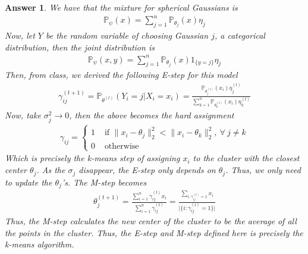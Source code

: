 \documentclass[12pt]{article}
\theoremstyle{colon}
\newtheorem*{answer}{Answer}
\begin{document}
\begin{answer}
  We have that the mixture for spherical Gaussians is
  \begin{gather*}
    \mathbb{P}_{\psi} (x) = \sum_{j=1}^n \mathbb{P}_{\theta_j} (x) \eta_j
  \end{gather*}
  Now, let $Y$ be the random variable of choosing Gaussian $j$, a categorical distribution, then the joint distribution is
  \begin{gather*}
    \mathbb{P}_{\psi} (x, y) = \sum_{j=1}^n \mathbb{P}_{\theta_j} (x) 1_{\{y = j\}} \eta_j
  \end{gather*}
  Then, from class, we derived the following E-step for this model
  \begin{gather*}
    \gamma_{ij}^{(t+1)} = \mathbb{P}_{\theta^{(t)}} (Y_i = j | X_i = x_i) = \frac{\mathbb{P}_{\theta_j^{(t)}}(x_i) \eta_j^{(t)}}{\sum_{k=1}^n \mathbb{P}_{\theta_k^{(t)}}(x_i) \eta_k^{(t)}}
  \end{gather*}
  Now, take $\sigma_j^2 \rightarrow 0$, then the above becomes the hard assignment
  \begin{gather*}
    \gamma_{ij} = \begin{cases}
      1 & \text{ if } \lVert x_i - \theta_j \rVert_2^2 < \lVert x_i - \theta_k \rVert_2^2, \ \forall \ j \neq k \\
      0 & \text{ otherwise}
    \end{cases}
  \end{gather*}
  Which is precisely the k-means step of assigning $x_i$ to the cluster with the closest center $\theta_j$. As the $\sigma_j$ disappear, the E-step only depends on $\theta_j$. Thus, we only need to update the $\theta_j$'s. The M-step becomes
  \begin{gather*}
    \theta_j^{(t+1)} = \frac{\sum_{i=1}^n \gamma_{ij}^{(t)} x_i}{\sum_{i=1}^n \gamma_{ij}^{(t)}} = \frac{\sum_{i: \gamma_{ij}^{(t)}=1} x_i}{\lvert \{ i : \gamma_{ij}^{(t)} = 1 \} \rvert}
  \end{gather*}
  Thus, the M-step calculates the new center of the cluster to be the average of all the points in the cluster. Thus, the E-step and M-step defined here is precisely the k-means algorithm.
\end{answer}

\clearpage
\end{document}
